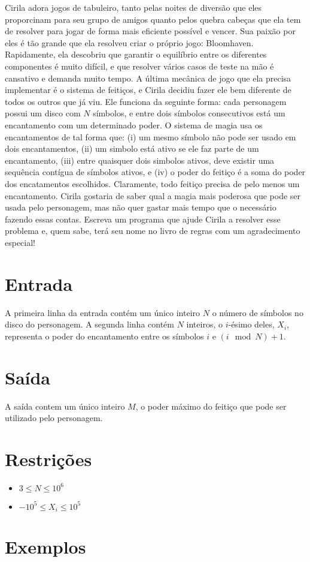 Cirila adora jogos de tabuleiro, tanto pelas noites de diversão que eles proporcinam para seu grupo de amigos quanto pelos quebra cabeças que ela tem de resolver para jogar de forma mais eficiente possível e vencer.
Sua paixão por eles é tão grande que ela resolveu criar o próprio jogo: Bloomhaven. Rapidamente, ela descobriu que garantir o equilíbrio entre os diferentes componentes é muito difícil, e que resolver vários casos de teste na mão é cansativo e demanda muito tempo.
A última mecânica de jogo que ela precisa implementar é o sistema de feitiços, e Cirila decidiu fazer ele bem diferente de todos os outros que já viu.
Ele funciona da seguinte forma: cada personagem possui um disco com $N$ símbolos, e entre dois símbolos consecutivos está um encantamento com um determinado poder.
O sistema de magia usa os encantamentos de tal forma que: (i) um mesmo símbolo não pode ser usado em dois encantamentos, (ii) um simbolo está ativo se ele faz parte de um encantamento, (iii) entre quaisquer dois simbolos ativos, deve existir uma sequência contígua de símbolos ativos, e (iv) o poder do feitiço é a soma do poder dos encatamentos escolhidos.
Claramente, todo feitiço precisa de pelo menos um encantamento.
Cirila gostaria de saber qual a magia mais poderosa que pode ser usada pelo personagem, mas não quer gastar mais tempo que o necessário fazendo essas contas.
Escreva um programa que ajude Cirila a resolver esse problema e, quem sabe, terá seu nome no livro de regras com um agradecimento especial!

\section*{Entrada}

A primeira linha da entrada contém um único inteiro $N$ o número de símbolos no disco do personagem.
A segunda linha contém $N$ inteiros, o $i$-ésimo deles, $X_i$, representa o poder do encantamento entre os símbolos $i$ e $(i \mod N) + 1$.

\section*{Saída}

A saída contem um único inteiro $M$, o poder máximo do feitiço que pode ser utilizado pelo personagem.

\section*{Restrições}

\begin{itemize}
\item $3 \leq N \leq 10^6$
\item $-10^5 \leq X_i \leq 10^5$
\end{itemize}


\section*{Exemplos}

\exemplo
